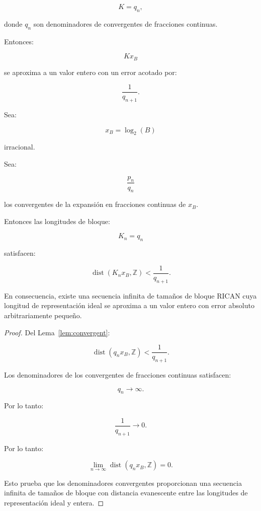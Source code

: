 \documentclass[onecolumn]{IEEEtran}
\begin{document}
\[
K=q_n,
\]

donde $q_n$ son denominadores de convergentes de fracciones continuas.

Entonces:

\[
Kx_B
\]

se aproxima a un valor entero con un error acotado por:

\[
\frac{1}{q_{n+1}} .
\]

\begin{theorem}
\label{thm:convergent}

Sea:

\[
x_B=\log_2(B)
\]

irracional.

Sea:

\[
\frac{p_n}{q_n}
\]

los convergentes de la expansión en fracciones continuas de $x_B$.

Entonces las longitudes de bloque:

\[
K_n=q_n
\]

satisfacen:

\[
\operatorname{dist}(K_nx_B,\mathbb{Z})
<
\frac{1}{q_{n+1}} .
\]

En consecuencia, existe una secuencia infinita de tamaños de bloque
RICAN cuya longitud de representación ideal se aproxima a un valor
entero con error absoluto arbitrariamente pequeño.

\end{theorem}

\begin{proof}

Del Lema~\ref{lem:convergent}:

\[
\operatorname{dist}(q_nx_B,\mathbb{Z})
<
\frac{1}{q_{n+1}} .
\]

Los denominadores de los convergentes de fracciones continuas
satisfacen:

\[
q_n\rightarrow\infty .
\]

Por lo tanto:

\[
\frac{1}{q_{n+1}}\rightarrow0 .
\]

Por lo tanto:

\[
\lim_{n\rightarrow\infty}
\operatorname{dist}(q_nx_B,\mathbb{Z})
=0 .
\]

Esto prueba que los denominadores convergentes proporcionan una
secuencia infinita de tamaños de bloque con distancia evanescente
entre las longitudes de representación ideal y entera.

\end{proof}
\end{document}
